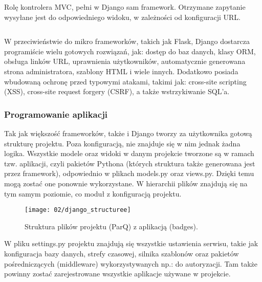 Rolę kontrolera MVC, pełni w Django sam framework. Otrzymane zapytanie wysyłane jest do odpowiedniego widoku, w zależności od konfiguracji URL.

\begin{singlespace}
	\vspace{0.3cm}
	\inputminted[fontsize=\footnotesize]{python}{src/urls.py}
	\label{l:url}
\end{singlespace}

W przeciwieństwie do mikro frameworków, takich jak Flask, Django dostarcza programiście wielu gotowych rozwiązań, jak: dostęp do baz danych, klasy ORM, obsługa linków URL, uprawnienia użytkowników, automatycznie generowana strona administratora, szablony HTML i wiele innych. Dodatkowo posiada wbudowaną ochronę przed typowymi atakami, takimi jak: cross-site scripting (XSS), cross-site request forgery (CSRF), a także wstrzykiwanie SQL'a.

\subsubsection*{Programowanie aplikacji}

Tak jak większość frameworków, także i Django tworzy za użytkownika gotową strukturę projektu. Poza konfiguracją, nie znajduje się w nim jednak żadna logika. Wszystkie modele oraz widoki w danym projekcie tworzone są w ramach tzw. aplikacji, czyli pakietów Pythona (których struktura także generowana jest przez framework), odpowiednio w plikach models.py oraz views.py. Dzięki temu mogą zostać one ponownie wykorzystane. W hierarchii plików znajdują się na tym samym poziomie, co moduł z konfiguracją projektu. 

\begin{figure}[h]
	\begin{center}
		\texttt{[image: 02/django\_structuree]}
	\end{center}
	\caption{Struktura plików projektu (ParQ) z aplikacją (badges).}
	\vspace{-0.3cm}
\end{figure}

W pliku settings.py projektu znajdują się wszystkie ustawienia serwisu, takie jak konfiguracja bazy danych, strefy czasowej, silnika szablonów oraz pakietów pośredniczących (middleware) wykorzystywanych np.: do autoryzacji. Tam także powinny zostać zarejestrowane wszystkie aplikacje używane w projekcie.

